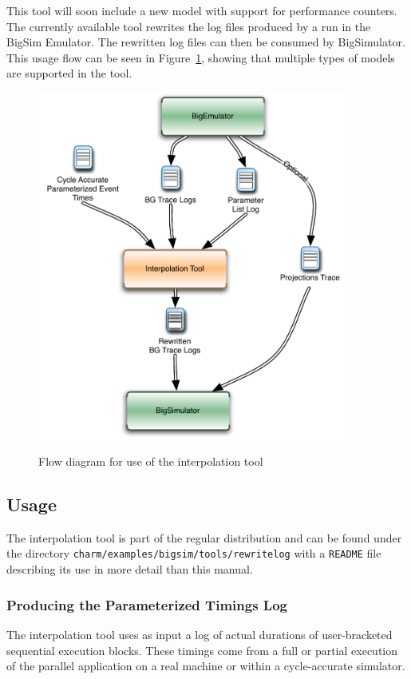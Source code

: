 This tool will soon include a new model with support for performance counters.
The currently available tool rewrites the log files produced by a run in the BigSim Emulator. 
The rewritten log files can then be consumed by BigSimulator. This usage flow can be seen in
Figure~\ref{fig:interpolationflow}, showing that multiple types of models are supported in the tool. 

\begin{figure}[!t]
\centering  
  \includegraphics[width=4in]{figures/InterpolationFlow}
{\sffamily\bfseries\small \caption{Flow diagram for use of the interpolation tool\label{fig:interpolationflow}}}
\end{figure}

\subsection{Usage\label{usage}}

The interpolation tool is part of the regular \charmpp{} distribution and 
can be found under the directory \texttt{charm/examples/bigsim/tools/rewritelog} with a \texttt{README} file describing its use in more detail than this manual.

\subsubsection{Producing the Parameterized Timings Log}
The interpolation tool uses as input a log of actual durations of user-bracketed sequential execution blocks.
These timings come from a full or partial execution of the parallel application on a real machine or
within a cycle-accurate simulator. 

